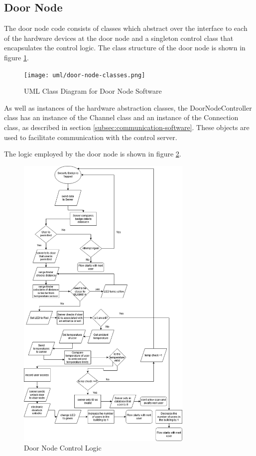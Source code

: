\subsection{Door Node}

The door node code consists of classes which abstract over the interface to each
of the hardware devices at the door node and a singleton control class that
encapsulates the control logic. The class structure of the door node is shown in
figure \ref{fig:door-node-classes}.

\begin{figure}[!htb]
\centering
\texttt{[image: uml/door-node-classes.png]}
\caption{UML Class Diagram for Door Node Software}
\label{fig:door-node-classes}
\end{figure}

As well as instances of the hardware abstraction classes, the DoorNodeController
class has an instance of the Channel class and an instance of the Connection
class, as described in section \ref{subsec:communication-software}. These
objects are used to facilitate communication with the control server.

The logic employed by the door node is shown in figure
\ref{fig:door-node-logic}.

\begin{figure}[!htb]
\centering
\includegraphics[width=0.75\textwidth]{images/door-node-flow.png}
\caption{Door Node Control Logic}
\label{fig:door-node-logic}
\end{figure}


